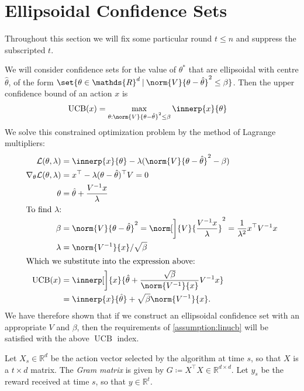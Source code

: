 \documentclass{article}
\newcommand{\defeq}{\coloneq}
\newcommand{\inv}[1]{#1^{-1}}
\newcommand{\Real}{\mathds{R}}
\newcommand{\UCB}{\operatorname{UCB}}
\newcommand\given[1][\delimsize]{%
  \providecommand{\delimsize}{}
  \nonscript\:#1\vert\allowbreak\nonscript\:\mathopen{}
}
\newcommand{\transp}[1]{#1^\top}
\begin{document}
\section{Ellipsoidal Confidence Sets}
\label{sec:ellips-conf-bounds}

Throughout this section we will fix some particular round $t \le n$
and suppress the subscripted $t$.

We will consider confidence sets for the value of $\theta^*$ that are
ellipsoidal with centre $\hat{\theta}$, of the form
$\set{\theta\in\Real^d \given \norm{V}{\theta-\hat{\theta}}^2 \le
  \beta}$.  Then the upper confidence bound of an action $x$ is
\begin{align*}
  \UCB(x) &= \max_{\theta: \norm{V}{\theta-\hat\theta}^2 \le \beta} \innerp{x}{\theta}
\end{align*}
We solve this constrained optimization problem by the method of
Lagrange multipliers:
\begin{align*}
  \mathcal{L}(\theta, \lambda) &= \innerp{x}{\theta} - \lambda(\norm{V}{\theta-\hat\theta}^2 - \beta) \\
  \nabla_\theta\mathcal{L}(\theta, \lambda) &= \transp{x} - \lambda\transp{(\theta-\hat\theta)}V = 0 \\
  \theta &= \hat\theta + \frac{{\inv{V}x}}{\lambda} \\
  \shortintertext{To find $\lambda$:}
  \beta &= \norm{V}{\theta-\hat\theta}^2
          = \norm[\bigg]{V}{\frac{\inv{V}x}{\lambda}}^2
          = \frac{1}{\lambda^2}\transp{x}\inv{V}x \\
  \lambda &= \norm{\inv{V}}{x} / \sqrt\beta \\
  \intertext{Which we substitute into the expression above:}
  \UCB(x) &= \innerp[\bigg]{x}{\hat\theta + \frac{\sqrt\beta}{\norm{\inv{V}}{x}}\inv{V}x} \\
          &= \innerp{x}{\hat\theta} + \sqrt\beta \norm{\inv{V}}{x}.
\end{align*}
We have therefore shown that if we construct an ellipsoidal confidence
set with an appropriate $V$ and $\beta$, then the requirements of
\cref{assumption:linucb} will be satisfied with the above $\UCB$
index.

Let $X_s \in \Real^d$ be the action vector selected by the algorithm at
time $s$, so that $X$ is a $t \times d$ matrix.  The \emph{Gram matrix} is given by
$G \defeq \transp{X}X \in \Real^{d \times d}$.  Let $y_s$ be the
reward received at time $s$, so that $y\in\Real^t$.
\end{document}
